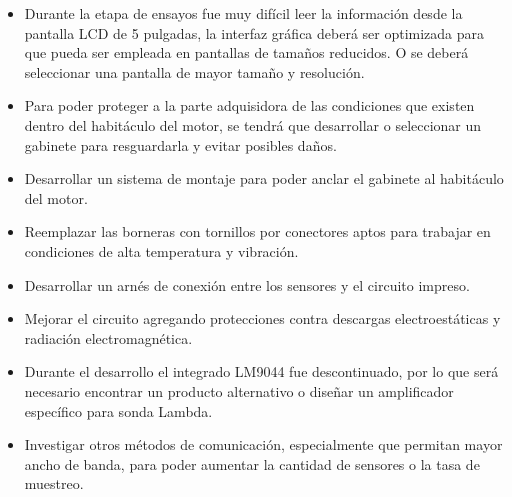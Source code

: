 \begin{itemize}
\item Durante la etapa de ensayos fue muy difícil leer la información desde la pantalla LCD de 5 pulgadas, la interfaz gráfica deberá ser optimizada para que pueda ser empleada en pantallas de tamaños reducidos. O se deberá seleccionar una pantalla de mayor tamaño y resolución.

\item Para poder proteger a la parte adquisidora de las condiciones que existen dentro del habitáculo del motor, se tendrá que desarrollar o seleccionar un gabinete para resguardarla y evitar posibles daños.

\item Desarrollar un sistema de montaje para poder anclar el gabinete al habitáculo del motor.

\item Reemplazar las borneras con tornillos por conectores aptos para trabajar en condiciones de alta temperatura y vibración.

\item Desarrollar un arnés de conexión entre los sensores y el circuito impreso.

\item Mejorar el circuito agregando protecciones contra descargas electroestáticas y radiación electromagnética.

\item Durante el desarrollo el integrado LM9044 fue descontinuado, por lo que será necesario encontrar un producto alternativo o diseñar un amplificador específico para sonda Lambda.

\item Investigar otros métodos de comunicación, especialmente que permitan mayor ancho de banda, para poder aumentar la cantidad de sensores o la tasa de muestreo.

\end{itemize}



